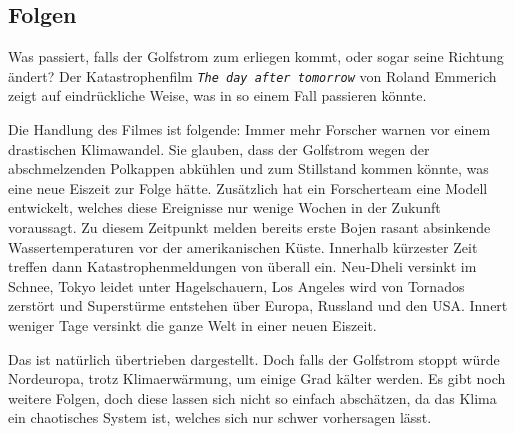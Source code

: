\subsection{Folgen}

Was passiert, falls der Golfstrom zum erliegen kommt, oder sogar seine Richtung ändert?
Der Katastrophenfilm \texttt{\em The day after tomorrow} von Roland Emmerich zeigt auf eindrückliche Weise, was in so einem Fall passieren könnte. 

Die Handlung des Filmes ist folgende: Immer mehr Forscher warnen vor einem drastischen Klimawandel. Sie glauben, dass der Golfstrom wegen der abschmelzenden Polkappen abkühlen und zum Stillstand kommen könnte, was eine neue Eiszeit zur Folge hätte. Zusätzlich hat ein Forscherteam eine Modell entwickelt, welches diese Ereignisse nur wenige Wochen in der Zukunft voraussagt. Zu diesem Zeitpunkt melden bereits erste Bojen rasant absinkende Wassertemperaturen vor der amerikanischen Küste. Innerhalb kürzester Zeit treffen dann Katastrophenmeldungen von überall ein. Neu-Dheli versinkt im Schnee, Tokyo leidet unter Hagelschauern, Los Angeles wird von Tornados zerstört und Superstürme entstehen über Europa, Russland und den USA. 
Innert weniger Tage versinkt die ganze Welt in einer neuen Eiszeit. 

Das ist natürlich übertrieben dargestellt. Doch falls der Golfstrom stoppt würde Nordeuropa, trotz Klimaerwärmung, um einige Grad kälter werden. Es gibt noch weitere Folgen, doch diese lassen sich nicht so einfach abschätzen, da das Klima ein chaotisches System ist, welches sich nur schwer vorhersagen lässt.

